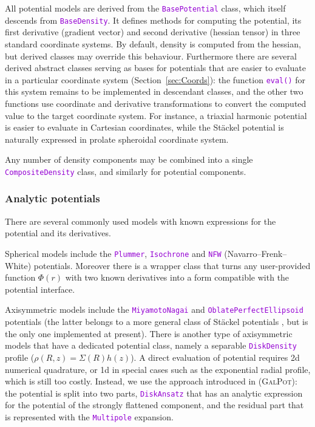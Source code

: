 \documentclass[12pt]{article}
\newcommand{\ttt}[1]{\textcolor{darkviolet}{\texttt{#1}}}
\begin{document}
All potential models are derived from the \ttt{BasePotential} class, which itself descends from \ttt{BaseDensity}. It defines methods for computing the potential, its first derivative (gradient vector) and second derivative (hessian tensor) in three standard coordinate systems. By default, density is computed from the hessian, but derived classes may override this behaviour.
Furthermore there are several derived abstract classes serving as bases for potentials that are easier to evaluate in a particular coordinate system (Section~\ref{sec:Coords}): the function \ttt{eval()} for this system remains to be implemented in descendant classes, and the other two functions use coordinate and derivative transformations to convert the computed value to the target coordinate system.
For instance, a triaxial harmonic potential is easier to evaluate in Cartesian coordinates, while the St\"ackel potential is naturally expressed in prolate spheroidal coordinate system.

Any number of density components may be combined into a single \ttt{CompositeDensity} class, and similarly for potential components.

\subsubsection{Analytic potentials}  \label{sec:PotentialAnalytic}

There are several commonly used models with known expressions for the potential and its derivatives. 

Spherical models include the \ttt{Plummer}, \ttt{Isochrone} and \ttt{NFW} (Navarro--Frenk--White) potentials. Moreover there is a wrapper class that turns any user-provided function $\Phi(r)$ with two known derivatives into a form compatible with the potential interface.

Axisymmetric models include the \ttt{MiyamotoNagai} and \ttt{OblatePerfectEllipsoid} potentials (the latter belongs to a more general class of St\"ackel potentials \cite{deZeeuw1985}, but is the only one implemented at present).
There is another type of axisymmetric models that have a dedicated potential class, namely a separable \ttt{DiskDensity} profile ($\rho(R,z) = \Sigma(R) h(z)$). A direct evaluation of potential requires 2d numerical quadrature, or 1d in special cases such as the exponential radial profile, which is still too costly. Instead, we use the approach introduced in \cite{KuijkenDubinski1995, DehnenBinney1998} (\textsc{GalPot}): the potential is split into two parts, \ttt{DiskAnsatz} that has an analytic expression for the potential of the strongly flattened component, and the residual part that is represented with the \ttt{Multipole} expansion.
\end{document}
